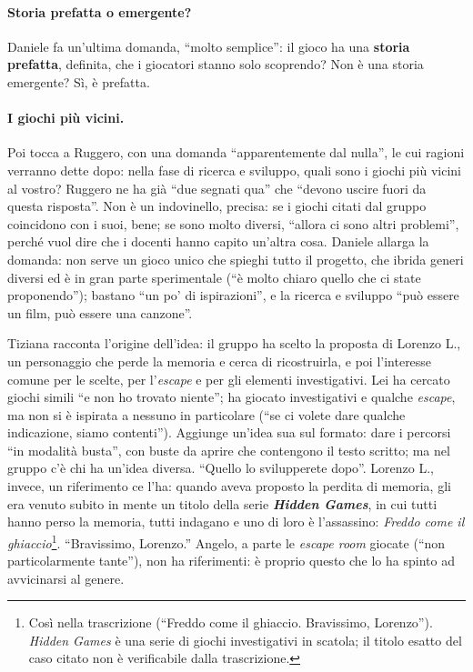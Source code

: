 \paragraph{Storia prefatta o emergente?} Daniele fa un'ultima domanda, ``molto
semplice'': il gioco ha una \textbf{storia prefatta}, definita, che i giocatori stanno
solo scoprendo? Non è una storia emergente? Sì, è prefatta.

\paragraph{I giochi più vicini.} Poi tocca a Ruggero, con una domanda ``apparentemente
dal nulla'', le cui ragioni verranno dette dopo: nella fase di ricerca e sviluppo, quali
sono i giochi più vicini al vostro? Ruggero ne ha già ``due segnati qua'' che ``devono
uscire fuori da questa risposta''. Non è un indovinello, precisa: se i giochi citati dal
gruppo coincidono con i suoi, bene; se sono molto diversi, ``allora ci sono altri
problemi'', perché vuol dire che i docenti hanno capito un'altra cosa. Daniele allarga
la domanda: non serve un gioco unico che spieghi tutto il progetto, che ibrida generi
diversi ed è in gran parte sperimentale (``è molto chiaro quello che ci state
proponendo''); bastano ``un po' di ispirazioni'', e la ricerca e sviluppo ``può essere un
film, può essere una canzone''.

Tiziana racconta l'origine dell'idea: il gruppo ha scelto la proposta di Lorenzo L., un
personaggio che perde la memoria e cerca di ricostruirla, e poi l'interesse comune per
le scelte, per l'\emph{escape} e per gli elementi investigativi. Lei ha cercato giochi
simili ``e non ho trovato niente''; ha giocato investigativi e qualche \emph{escape}, ma
non si è ispirata a nessuno in particolare (``se ci volete dare qualche indicazione,
siamo contenti''). Aggiunge un'idea sua sul formato: dare i percorsi ``in modalità
busta'', con buste da aprire che contengono il testo scritto; ma nel gruppo c'è chi ha
un'idea diversa. ``Quello lo svilupperete dopo''. Lorenzo L., invece, un riferimento ce
l'ha: quando aveva proposto la perdita di memoria, gli era venuto subito in mente un
titolo della serie \textbf{\emph{Hidden Games}}, in cui tutti hanno perso la memoria,
tutti indagano e uno di loro è l'assassino: \emph{Freddo come il
ghiaccio}\footnote{Così nella trascrizione (``Freddo come il ghiaccio. Bravissimo,
Lorenzo''). \emph{Hidden Games} è una serie di giochi investigativi in scatola; il
titolo esatto del caso citato non è verificabile dalla trascrizione.}. ``Bravissimo,
Lorenzo.'' Angelo, a parte le \emph{escape room} giocate (``non particolarmente
tante''), non ha riferimenti: è proprio questo che lo ha spinto ad avvicinarsi al genere.

